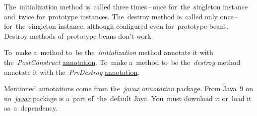 \noindent The~initialization method is~called three times\,--\,once for~the~singleton instance and~twice for~prototype instances. The~destroy method is~called only once\,--\,for~the~singleton instance, although configured even for~prototype beans. Destroy methods of~prototype beans don't work.

To~make a~method to~be the~\textit{initialization} method annotate it with the~\textit{PostConstruct} \hyperref[javaannotation]{annotation}. To~make a~method to~be the~\textit{destroy} method annotate it with the~\textit{PreDestroy} \hyperref[javaannotation]{annotation}.

\warning Mentioned annotations come from the~\hyperref[javax]{\textit{javax}} \textit{annotation} package. From Java~9 on no~\hyperref[javax]{\textit{javax}} package is a~part of~the~default Java. You~must download it or~load it as~a~dependency.


